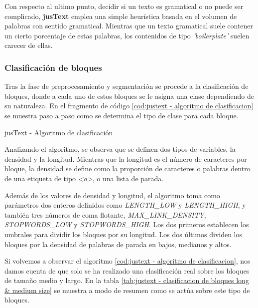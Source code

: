 Con respecto al ultimo punto, decidir si un texto es gramatical o no puede ser complicado, \textbf{jusText} 
emplea una simple heurística basada en el volumen de palabras con sentido gramatical. Mientras que un texto 
gramatical suele contener un cierto porcentaje de estas palabras, los contenidos de tipo \emph{'boilerplate'} 
suelen carecer de ellas.

\subsubsection{Clasificación de bloques}
\label{subsubsec:clasificacion de bloques}

Tras la fase de preprocesamiento y segmentación se procede a la clasificación de bloques, donde a cada uno
de estos bloques se le asigna una clase dependiendo de su naturaleza. En el fragmento de código 
\ref{cod:justext - algoritmo de clasificacion} se muestra paso a paso como se determina el tipo de clase 
para cada bloque.

\begin{codefloat}
  
  \caption{jusText - Algoritmo de clasificación}
  \label{cod:justext - algoritmo de clasificacion}
\end{codefloat}

Analizando el algoritmo, se observa que se definen dos tipos de variables, la densidad y la longitud. 
Mientras que la longitud es el número de caracteres por bloque, la densidad se define como la proporción 
de caracteres o palabras dentro de una etiqueta de tipo \emph{<a>}, o una lista de parada.

Además de los valores de densidad y longitud, el algoritmo toma como parámetros dos enteros definidos como
\emph{LENGTH\_LOW} y \emph{LENGTH\_HIGH}, y también tres números de coma flotante, \emph{MAX\_LINK\_DENSITY},
\emph{STOPWORDS\_LOW} y \emph{STOPWORDS\_HIGH}. Los dos primeros establecen los umbrales para dividir los 
bloques por su longitud. Los dos últimos dividen los bloques por la densidad de palabras de parada en bajos, 
medianos y altos.

Si volvemos a observar el algoritmo \ref{cod:justext - algoritmo de clasificacion}, nos damos cuenta de
que solo se ha realizado una clasificación real sobre los bloques de tamaño medio y largo. En la tabla
\ref{tab:justext - clasificacion de bloques long & medium size} se muestra a modo de resumen como se actúa 
sobre este tipo de bloques.

